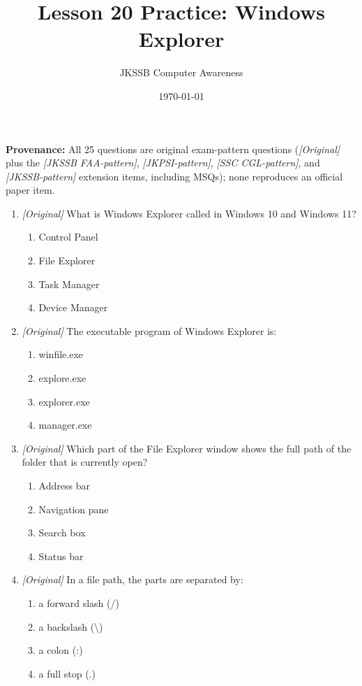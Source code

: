 \documentclass[11pt]{article}
\title{Lesson 20 Practice: Windows Explorer}
\author{JKSSB Computer Awareness}
\date{\today}
\begin{document}
\maketitle
\noindent\textbf{Provenance:} All 25 questions are original exam-pattern questions (\textit{[Original]} plus the \textit{[JKSSB FAA-pattern]}, \textit{[JKPSI-pattern]}, \textit{[SSC CGL-pattern]}, and \textit{[JKSSB-pattern]} extension items, including MSQs); none reproduces an official paper item.

\begin{enumerate}[label=\textbf{Q\arabic*.}, leftmargin=*]
\item \textit{[Original]} What is Windows Explorer called in Windows 10 and
  Windows 11?
  \begin{enumerate}[label=\Alph*.]
    \item Control Panel
    \item File Explorer
    \item Task Manager
    \item Device Manager
  \end{enumerate}
\item \textit{[Original]} The executable program of Windows Explorer is:
  \begin{enumerate}[label=\Alph*.]
    \item winfile.exe
    \item explore.exe
    \item explorer.exe
    \item manager.exe
  \end{enumerate}
\item \textit{[Original]} Which part of the File Explorer window shows the
  full path of the folder that is currently open?
  \begin{enumerate}[label=\Alph*.]
    \item Address bar
    \item Navigation pane
    \item Search box
    \item Status bar
  \end{enumerate}
\item \textit{[Original]} In a file path, the parts are separated by:
  \begin{enumerate}[label=\Alph*.]
    \item a forward slash (/)
    \item a backslash (\textbackslash)
    \item a colon (:)
    \item a full stop (.)

\end{enumerate}
\end{enumerate}
\end{document}
